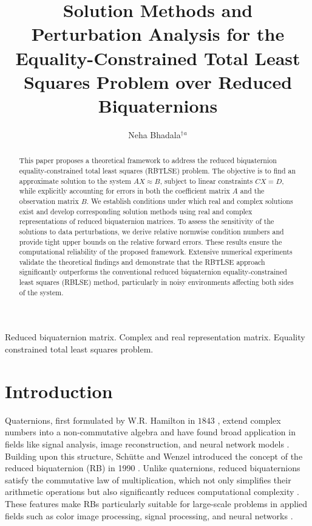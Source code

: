 \documentclass[preprint,11pt,3p]{elsarticle}
\begin{document}
\begin{frontmatter}
\title{Solution Methods and Perturbation Analysis for the Equality-Constrained Total Least Squares Problem over Reduced Biquaternions
}
\author{Neha Bhadala$^\dagger$$^a$}

\address{
 $^{\dagger}$ Department of Computational and Data Sciences, Indian Institute of Science, Bengaluru,  India
\\\textit{E-mail\,$^a$}: \texttt{bhadalaneha@gmail.com}
}

\begin{abstract}
This paper proposes a theoretical framework to address the reduced biquaternion equality-constrained total least squares (RBTLSE) problem. The objective is to find an approximate solution to the system $AX \approx B$, subject to linear constraints $CX = D$, while explicitly accounting for errors in both the coefficient matrix $A$ and the observation matrix $B$. We establish conditions under which real and complex solutions exist and develop corresponding solution methods using real and complex representations of reduced biquaternion matrices. To assess the sensitivity of the solutions to data perturbations, we derive relative normwise condition numbers and provide tight upper bounds on the relative forward errors. These results ensure the computational reliability of the proposed framework. Extensive numerical experiments validate the theoretical findings and demonstrate that the RBTLSE approach significantly outperforms the conventional reduced biquaternion equality-constrained least squares (RBLSE) method, particularly in noisy environments affecting both sides of the system.
\end{abstract}

\begin{keyword}
Reduced biquaternion matrix.  Complex and real representation matrix.  Equality constrained total least squares problem.
\end{keyword}
\end{frontmatter}

\section{Introduction}\label{sec1}


Quaternions, first formulated by W.R. Hamilton in $1843$ \cite{MR237284}, extend complex numbers into a non-commutative algebra and have found broad application in fields like signal analysis, image reconstruction, and neural network models \cite{MR4835709, said2008fast, zeng2016color}. Building upon this structure, Schütte and Wenzel introduced the concept of the reduced biquaternion (RB) in 1990 \cite{schutte1990hypercomplex}. Unlike quaternions, reduced biquaternions satisfy the commutative law of multiplication, which not only simplifies their arithmetic operations but also significantly reduces computational complexity \cite{MR2087700, MR2517402}. These features make RBs particularly suitable for large-scale problems in applied fields such as color image processing, signal processing, and neural networks \cite{gai2021reduced, gai2024regularization, MR3300514, MR2087700}.
\end{document}
